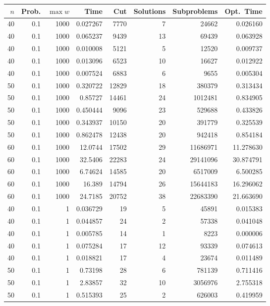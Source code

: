 \documentclass[a4paper,11pt]{article}
\begin{document}
\begin{table}
\begin{center}
\begin{tabular}{|rrr|r|r|rr|r|}
\hline
$n$ & Prob. & $\max w$ & Time & Cut & Solutions & Subproblems & Opt.\ Time \\
\hline
40 & 0.1 & 1000 & 0.027267 & 7770 & 7 & 24662 & 0.026160 \\
40 & 0.1 & 1000 & 0.065237 & 9439 & 13 & 69439 & 0.063928 \\
40 & 0.1 & 1000 & 0.010008 & 5121 & 5 & 12520 & 0.009737 \\
40 & 0.1 & 1000 & 0.013096 & 6523 & 10 & 16627 & 0.012922 \\
40 & 0.1 & 1000 & 0.007524 & 6883 & 6 & 9655 & 0.005304 \\
50 & 0.1 & 1000 & 0.320722 & 12829 & 18 & 380379 & 0.313434 \\
50 & 0.1 & 1000 & 0.85727 & 14461 & 24 & 1012481 & 0.834905 \\
50 & 0.1 & 1000 & 0.450444 & 9096 & 23 & 529688 & 0.433826 \\
50 & 0.1 & 1000 & 0.343937 & 10150 & 20 & 391779 & 0.325539 \\
50 & 0.1 & 1000 & 0.862478 & 12438 & 20 & 942418 & 0.854184 \\
60 & 0.1 & 1000 & 12.0744 & 17502 & 29 & 11686971 & 11.278630 \\
60 & 0.1 & 1000 & 32.5406 & 22283 & 24 & 29141096 & 30.874791 \\
60 & 0.1 & 1000 & 6.74624 & 14585 & 20 & 6517009 & 6.500285 \\
60 & 0.1 & 1000 & 16.389 & 14794 & 26 & 15644183 & 16.296062 \\
60 & 0.1 & 1000 & 24.7185 & 20752 & 38 & 22683390 & 21.663690 \\
\hline
40 & 0.1 & 1 & 0.036729 & 19 & 5 & 45891 & 0.015383 \\
40 & 0.1 & 1 & 0.044857 & 24 & 2 & 57338 & 0.041048 \\
40 & 0.1 & 1 & 0.005785 & 14 & 1 & 8223 & 0.000006 \\
40 & 0.1 & 1 & 0.075284 & 17 & 12 & 93339 & 0.074613 \\
40 & 0.1 & 1 & 0.018821 & 17 & 4 & 23674 & 0.011489 \\
50 & 0.1 & 1 & 0.73198 & 28 & 6 & 781139 & 0.711416 \\
50 & 0.1 & 1 & 2.83857 & 32 & 10 & 3056976 & 2.755318 \\
50 & 0.1 & 1 & 0.515393 & 25 & 2 & 626003 & 0.419959 \\

\end{tabular}
\end{center}
\end{table}
\end{document}
